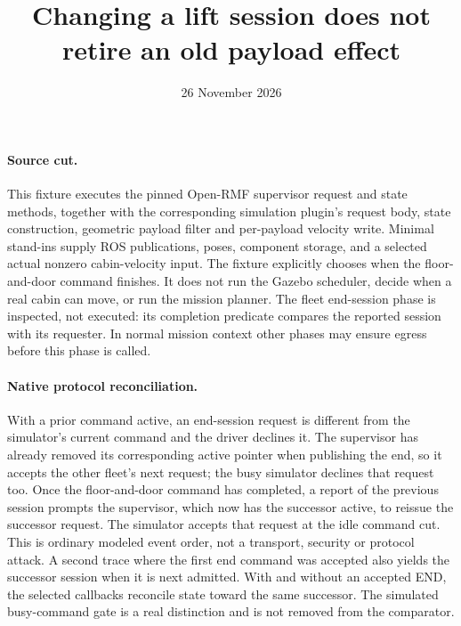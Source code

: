 \documentclass[11pt]{article}
\title{Changing a lift session does not retire an old payload effect}
\date{26 November 2026}
\begin{document}
\maketitle

\paragraph{Source cut.}
This fixture executes the pinned Open-RMF supervisor request and
state methods, together with the corresponding simulation plugin's
request body, state construction, geometric payload filter and
per-payload velocity write. Minimal stand-ins supply ROS publications,
poses, component storage, and a selected actual nonzero cabin-velocity
input. The fixture explicitly chooses when the floor-and-door command
finishes. It does not run the Gazebo scheduler, decide when a real
cabin can move, or run the mission planner. The fleet end-session
phase is inspected, not executed: its completion predicate compares
the reported session with its requester. In normal mission context
other phases may ensure egress before this phase is called.

\paragraph{Native protocol reconciliation.}
With a prior command active, an end-session request is different
from the simulator's current command and the driver declines it.
The supervisor has already removed its corresponding active pointer
when publishing the end, so it accepts the other fleet's next
request; the busy simulator declines that request too. Once
the floor-and-door command has completed, a report of the previous
session prompts the supervisor, which now has the successor active,
to reissue the successor request. The simulator accepts that
request at the idle command cut. This is ordinary modeled event
order, not a transport, security or protocol attack. A second trace
where the first end command was accepted also yields the successor
session when it is next admitted. With and without an accepted END,
the selected callbacks reconcile state toward the same successor.
The simulated busy-command gate is a real distinction and is not
removed from the comparator.
\end{document}
